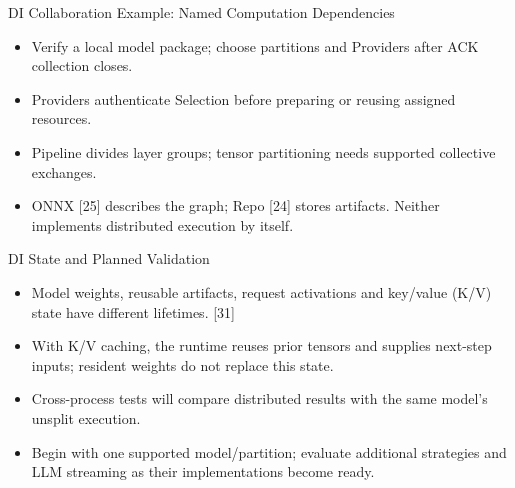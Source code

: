 \begin{frame}{DI Collaboration Example: Named Computation Dependencies}
\begin{center}
\end{center}
\begin{itemize}
\item Verify a local model package; choose partitions and Providers after ACK collection closes.
\item Providers authenticate Selection before preparing or reusing assigned resources.
\item Pipeline divides layer groups; tensor partitioning needs supported collective exchanges.
\item ONNX [25] describes the graph; Repo [24] stores artifacts. Neither implements distributed execution by itself.
\end{itemize}
\end{frame}

\begin{frame}{DI State and Planned Validation}
\begin{itemize}
\item Model weights, reusable artifacts, request activations and key/value (K/V) state have different lifetimes. [31]
\item With K/V caching, the runtime reuses prior tensors and supplies next-step inputs; resident weights do not replace this state.
\item Cross-process tests will compare distributed results with the same model's unsplit execution.
\item Begin with one supported model/partition; evaluate additional strategies and LLM streaming as their implementations become ready.
\end{itemize}
\vspace{3mm}
\end{frame}

